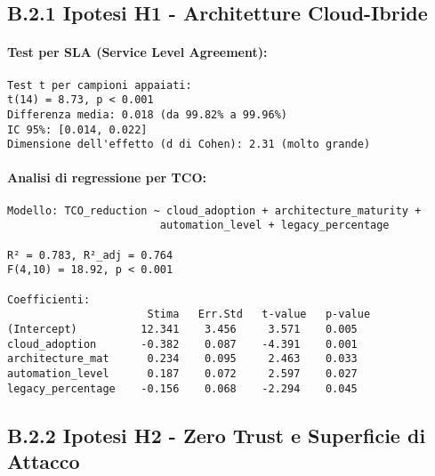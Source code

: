 \subsection{\texorpdfstring{\textbf{B.2.1 Ipotesi H1 - Architetture Cloud-Ibride}}{B.2.1 - Ipotesi H1 - Architetture Cloud-Ibride}}

\paragraph{Test per SLA (Service Level Agreement):}
\begin{lstlisting}[basicstyle=\small\ttfamily]
Test t per campioni appaiati:
t(14) = 8.73, p < 0.001
Differenza media: 0.018 (da 99.82% a 99.96%)
IC 95%: [0.014, 0.022]
Dimensione dell'effetto (d di Cohen): 2.31 (molto grande)
\end{lstlisting}

\paragraph{Analisi di regressione per TCO:}
\begin{lstlisting}[basicstyle=\small\ttfamily]
Modello: TCO_reduction ~ cloud_adoption + architecture_maturity + 
                        automation_level + legacy_percentage

R² = 0.783, R²_adj = 0.764
F(4,10) = 18.92, p < 0.001

Coefficienti:
                      Stima   Err.Std   t-value   p-value
(Intercept)          12.341    3.456     3.571    0.005
cloud_adoption       -0.382    0.087    -4.391    0.001
architecture_mat      0.234    0.095     2.463    0.033
automation_level      0.187    0.072     2.597    0.027
legacy_percentage    -0.156    0.068    -2.294    0.045
\end{lstlisting}

\subsection{\texorpdfstring{\textbf{B.2.2 Ipotesi H2 - Zero Trust e Superficie di Attacco}}{B.2.2 - Ipotesi H2 - Zero Trust e Superficie di Attacco}}

